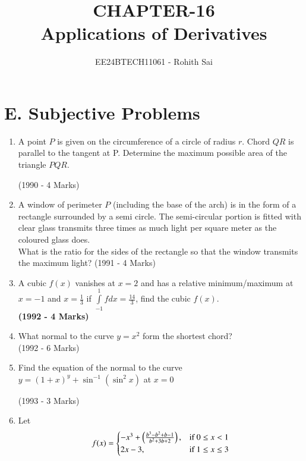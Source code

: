 \documentclass[journal,12pt,twocolumn]{IEEEtran}
\theoremstyle{remark}
\begin{document}

\vspace{3cm}

\title{CHAPTER-16\\Applications of Derivatives}
\author{EE24BTECH11061 - Rohith Sai}
\maketitle
\newpage
\bigskip

\renewcommand{\thefigure}{\theenumi}
\renewcommand{\thetable}{\theenumi}

\section{\textbf{E. Subjective Problems}}

\begin{enumerate}

\item A point $P$ is given on the circumference of a circle of radius $r$. Chord $QR$ is parallel to the tangent at P. Determine the maximum possible area of the triangle $PQR.$

\hfill (1990 - 4 Marks)


\item A window of perimeter $P$ (including the base of the arch) is in the form of a rectangle surrounded by a semi circle. The semi-circular portion is fitted with clear glass transmits three times as much light per square meter as the coloured glass does.\\What is the ratio for the sides of the rectangle so that the window transmits the maximum light?
\hfill (1991 - 4 Marks)

\item A cubic $f(x)$ vanishes at $x=2$ and has a relative minimum/maximum at $x=-1$ and $x=\frac{1}{3}$ if $\int\limits_{-1}^1 f dx = \frac{14}{3}$, find the cubic $f(x)$.\\
\hfill{\textbf{(1992 - 4 Marks)}}

\item What normal to the curve $y=x^2$ form the shortest chord?\\
\hfill (1992 - 6 Marks)

\item Find the equation of the normal to the curve $y=(1+x)^y + \sin^{-1}(\sin^2x)$ at $x=0$

\hfill (1993 - 3 Marks)


\item Let 
\[ f(x) = \begin{cases}
-x^3 + \left(\frac{b^3-b^2+b-1}{b^2+3b+2}\right), & \text{if } 0\leq x < 1\\
2x-3, & \text{if } 1\leq x \leq 3
\end{cases}
\]


\end{enumerate}
\end{document}
